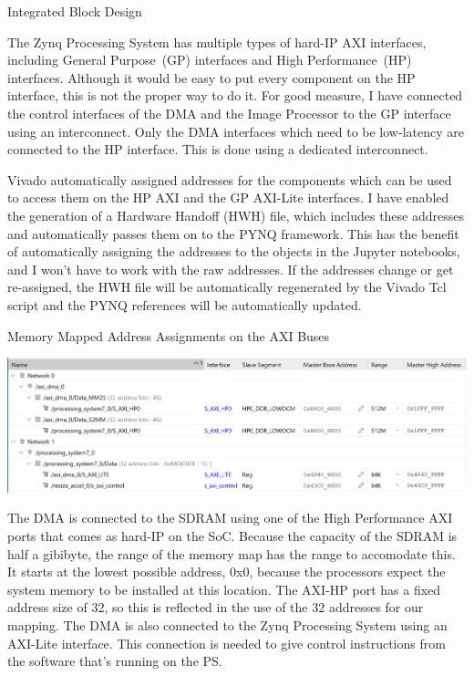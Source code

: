 \documentclass{matthijs}
\begin{document}
\begin{hoofdstuk}{Integrated Block Design}
		\bigskip

		The Zynq Processing System has multiple types of hard-IP AXI interfaces, including General Purpose~(GP) interfaces and High Performance~(HP) interfaces.
		Although it would be easy to put every component on the HP interface, this is not the proper way to do it.
		For good measure, I have connected the control interfaces of the DMA and the Image Processor to the GP interface using an interconnect.
		Only the DMA interfaces which need to be low-latency are connected to the HP interface.
		This is done using a dedicated interconnect.

		\bigskip

		Vivado automatically assigned addresses for the components which can be used to access them on the HP AXI and the GP AXI-Lite interfaces.
		I have enabled the generation of a Hardware Handoff (HWH) file, which includes these addresses and automatically passes them on to the PYNQ framework.
		This has the benefit of automatically assigning the addresses to the objects in the Jupyter notebooks, and I won't have to work with the raw addresses.
		If the addresses change or get re-assigned, the HWH file will be automatically regenerated by the Vivado Tcl script and the PYNQ references will be automatically updated.

		\begin{figuur}{Memory Mapped Address Assignments on the AXI Buses}

			\centerline{
				\includegraphics[width=1.1\textwidth, clip, trim=2pt 0 0 2pt]{vivado-bd-address-map-bad-quality.png}
			}

		\end{figuur}
		
		\bigskip

		The DMA is connected to the SDRAM using one of the High Performance AXI ports that comes as hard-IP on the SoC.
		Because the capacity of the SDRAM is half a gibibyte, the range of the memory map has the range to accomodate this.
		It starts at the lowest possible address, 0x0, because the processors expect the system memory to be installed at this location.
		The AXI-HP port has a fixed address size of \qty{32}{\bit}, so this is reflected in the use of the \qty{32}{\bit} addresses for our mapping.
		The DMA is also connected to the Zynq Processing System using an AXI-Lite interface.
		This connection is needed to give control instructions from the software that's running on the PS.


\end{hoofdstuk}
\end{document}
